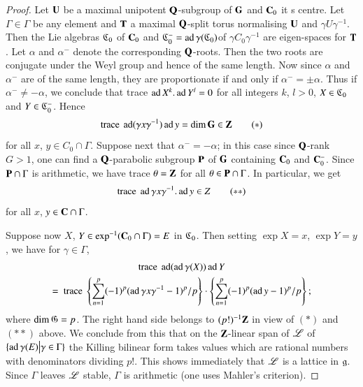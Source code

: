 \begin{proof}
Let $\mathbf{U}$ be a maximal unipotent $\mathbf{Q}$-subgroup of $\mathbf{G}$ and $\mathbf{C}_0$ it s centre. Let $\Gamma \in \Gamma$ be any element and $\mathbf{T}$ a maximal $\mathbf{Q}$-split torus normalising $\mathbf{U}$ and $\gamma U \gamma^{-1}$. Then the Lie algebras $\mathfrak{C}_0$ of $\mathbf{C}_0$ and $\mathfrak{C}^-_0 = \operatorname{ad} \gamma (\mathfrak{C}_0)$\pageoriginale of $\gamma C_0 \gamma^{-1}$ are eigen-spaces for $\mathbf{T}$. Let $\alpha$ and $\alpha^-$ denote the corresponding $\mathbf{Q}$-roots. Then the two roots are conjugate under the Weyl group and hence of the same length. Now since $\alpha$ and $\alpha^-$ are of the same length, they are proportionate if and only if $\alpha^-= \pm \alpha$. Thus if $\alpha^- \neq - \alpha$, we conclude that trace $\operatorname{ad} X^k. \operatorname{ad} Y^l = 0$ for all integers $k$, $l > 0$, $X \in \mathfrak{C}_0$ and $Y \in \mathfrak{C}^-_0$. Hence
\begin{equation}
\text{trace } \operatorname{ad} (\gamma x \gamma^{-1}) \operatorname{ad} y = \dim \mathbf{G} \in \mathbf{Z} \tag*{($\ast$)}
\end{equation}
for all $x$, $y \in C_0 \cap \Gamma$. Suppose next that $\alpha^-= - \alpha$; in this case since $\mathbf{Q}$-rank $G > 1$, one can find a $\mathbf{Q}$-parabolic subgroup $\mathbf{P}$ of $\mathbf{G}$ containing $\mathbf{C}_0$ and $\mathbf{C}^-_0$. Since $\mathbf{P} \cap \Gamma$ is arithmetic, we have trace $\theta = \mathbf{Z}$ for all $\theta \in\mathbf{P} \cap \Gamma$. In particular, we get
\begin{equation}
\text{trace } \operatorname{ad} \gamma x \gamma^{-1} . \operatorname{ad} y \in Z \tag*{($\ast\ast$)}
\end{equation}
for all $x$, $y \in \mathbf{C} \cap\Gamma$.

Suppose now $X$, $Y \in \exp^{-1} (\mathbf{C}_0 \cap \Gamma) = E $ in $\mathfrak{C}_0$. Then setting $\exp X  = x$, $\exp Y =y$, we have for $\gamma \in \Gamma$,
\begin{gather*}
\text{trace } \operatorname{ad} (\operatorname{ad} \gamma (X)) \operatorname{ad} Y\\
= \text{ trace } \left\{\sum\limits^{p}_{n=1} (-1)^p (\operatorname{ad} \gamma x \gamma^{-1} -1)^p/p  \right\} \cdot \left\{ \sum\limits^p_{n=1} (-1)^p (\operatorname{ad} y - 1)^p/p
 \right\};
\end{gather*}
where $\dim \mathfrak{G}= p$. The right hand side belongs to $(p!)^{-1} \mathbf{Z}$ in view of $(\ast)$ and $(\ast\ast)$ above. We conclude from this that on the $\mathbf{Z}$-linear span of $\mathscr{L}$ of $\{\operatorname{ad} \gamma (E) \big| \gamma \in \Gamma\}$ the Killing bilinear form takes values which are rational numbers with denominators dividing $p!$. This shows immediately that $\mathscr{L}$ is a lattice in $\mathfrak{g}$. Since $\Gamma$ leaves $\mathscr{L}$ stable, $\Gamma$ is arithmetic (one uses Mahler's criterion).
\end{proof}

